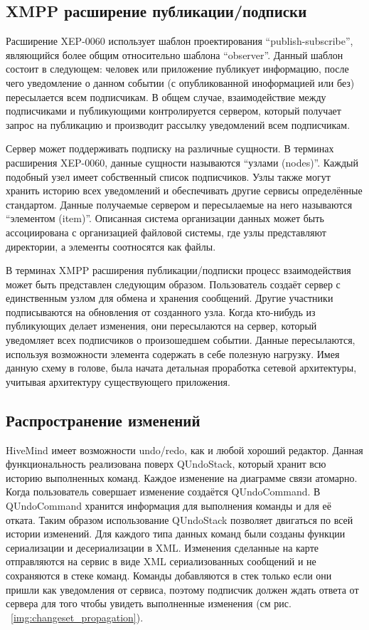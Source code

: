 \subsection{XMPP расширение публикации/подписки}
Расширение XEP-0060 использует шаблон проектирования ``publish-subscribe'',
являющийся более общим относительно шаблона ``observer''. Данный шаблон состоит
в следующем: человек или приложение публикует информацию, после чего уведомление
о данном событии (с опубликованной иноформацией или без) пересылается всем
подписчикам. В общем случае, взаимодействие между подписчиками и публикующими
контролируется сервером, который получает запрос на публикацию и производит
рассылку уведомлений всем подписчикам.

Сервер может поддерживать подписку на различные сущности. В терминах расширения
XEP-0060, данные сущности называются ``узлами (nodes)''. Каждый подобный узел
имеет собственный список подписчиков. Узлы также могут хранить историю всех
уведомлений и обеспечивать другие сервисы определённые стандартом. Данные
получаемые сервером и пересылаемые на него называются ``элементом (item)''.
Описанная система организации данных может быть ассоциирована с организацией
файловой системы, где узлы представляют директории, а элементы соотносятся как
файлы.

В терминах XMPP расширения публикации/подписки процесс взаимодействия может быть
представлен следующим образом. Пользователь создаёт сервер с единственным узлом
для обмена и хранения сообщений. Другие участники подписываются на обновления от
созданного узла. Когда кто-нибудь из публикующих делает изменения, они
пересылаются на сервер, который уведомляет всех подписчиков о произошедшем
событии. Данные пересылаются, используя возможности элемента содержать в себе
полезную нагрузку. Имея данную схему в голове, была начата детальная проработка
сетевой архитектуры, учитывая архитектуру существующего приложения.

\subsection{Распространение изменений}
HiveMind имеет возможности undo/redo, как и любой хороший редактор. Данная
функциональность реализована поверх QUndoStack, который хранит всю историю
выполненных команд. Каждое изменение на диаграмме связи атомарно. Когда
пользователь совершает изменение создаётся QUndoCommand. В QUndoCommand хранится
информация для выполнения команды и для её отката. Таким образом использование
QUndoStack позволяет двигаться по всей истории изменений. Для каждого типа
данных команд были созданы функции сериализации и десериализации в XML.
Изменения сделанные на карте отправляются на сервис в виде XML сериализованных
сообщений и не сохраняются в стеке команд. Команды добавляются в стек только
если они пришли как уведомления от сервиса, поэтому подписчик должен ждать
ответа от сервера для того чтобы увидеть выполненные изменения (см рис.
~\ref{img:changeset_propagation}).


